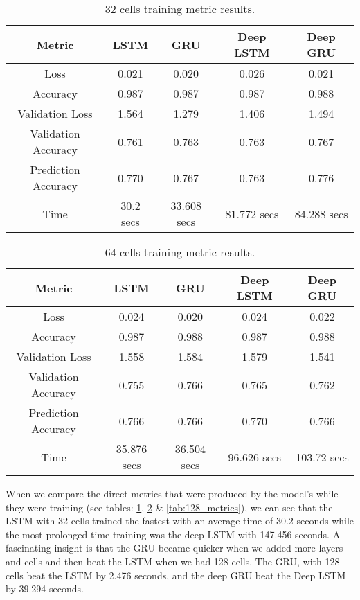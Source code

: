 \documentclass[a4paper,10pt]{article}
\begin{document}
	\begin{table}[t]
		\centering
		\small
		\begin{tabular}[t]{ | c | c | c | c | c | }
			\hline
			Metric          & LSTM  & GRU   & Deep LSTM & Deep GRU \\ 
			\hline
			Loss            & 0.021 & 0.020 & 0.026     & 0.021 \\ 
			\hline
			Accuracy        & 0.987 & 0.987 & 0.987     & 0.988  \\ 
			\hline
			Validation Loss & 1.564 & 1.279 & 1.406 & 1.494 \\
			\hline
			Validation Accuracy & 0.761 & 0.763 & 0.763 & 0.767 \\
			\hline
			Prediction Accuracy & 0.770     & 0.767 & 0.763     & 0.776 \\
			\hline 
			Time & 30.2 secs & 33.608 secs & 81.772 secs & 84.288 secs \\ 
			\hline
		\end{tabular}
		\caption{32 cells training metric results.}
		\label{tab:32_metrics}
	\end{table}%

	\begin{table}[b]
		\centering
		\small
		\begin{tabular}[t]{ | c | c | c | c | c | }
			\hline
			Metric              & LSTM  & GRU   & Deep LSTM & Deep GRU \\ 
			\hline
			Loss                & 0.024 & 0.020 & 0.024     & 0.022 \\ 
			\hline
			Accuracy            & 0.987 & 0.988 & 0.987     & 0.988  \\ 
			\hline
			Validation Loss     & 1.558 & 1.584 & 1.579     & 1.541 \\
			\hline
			Validation Accuracy & 0.755 & 0.766 & 0.765     & 0.762 \\
			\hline
			Prediction Accuracy & 0.766     & 0.766 & 0.770     & 0.766  \\ 
			\hline
			Time & 35.876 secs & 36.504 secs & 96.626 secs & 103.72 secs \\ 
			\hline
		\end{tabular}
		\caption{64 cells training metric results.}
		\label{tab:64_metrics}
	\end{table}%
	When we compare the direct metrics that were produced by the model's while they were training (see tables: \ref{tab:32_metrics}, \ref{tab:64_metrics} \& \ref{tab:128_metrics}), we can see that the LSTM with 32 cells trained the fastest with an average time of 30.2 seconds while the most prolonged time training was the deep LSTM with 147.456 seconds. A fascinating insight is that the GRU became quicker when we added more layers and cells and then beat the LSTM when we had 128 cells. The GRU, with 128 cells beat the LSTM by 2.476 seconds, and the deep GRU beat the Deep LSTM by 39.294 seconds.
\end{document}
